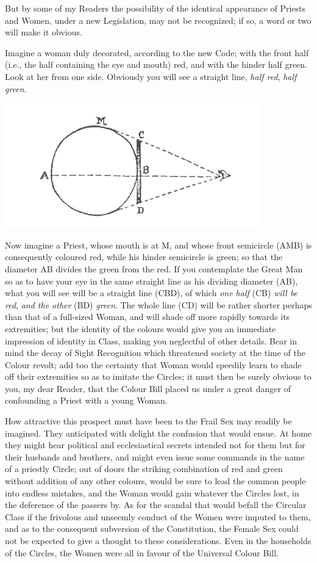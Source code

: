\documentclass[10pt, kindle, oneside]{kindle}
\begin{document}
But by some of my Readers the possibility of the identical appearance of
Priests and Women, under a new Legislation, may not be recognized; if so, a
word or two will make it obvious.

Imagine a woman duly decorated, according to the new Code; with the front half
(i.e., the half containing the eye and mouth) red, and with the hinder half
green. Look at her from one side. Obviously you will see a straight line, \emph{half
red}, \emph{half green}. 
\begin{center}
    \includegraphics[trim=0mm 0mm 0mm 0mm, scale=0.5]{fig5}
\end{center}

Now imagine a Priest, whose mouth is at M, and whose front semicircle (AMB) is
consequently coloured red, while his hinder semicircle is green; so that the
diameter AB divides the green from the red. If you contemplate the Great Man
so as to have your eye in the same straight line as his dividing diameter
(AB), what you will see will be a straight line (CBD), of which \emph{one half} (CB)
\emph{will be red}, \emph{and the other} (BD) \emph{green}. The whole line (CD) will be rather
shorter perhaps than that of a full-sized Woman, and will shade off more
rapidly towards its extremities; but the identity of the colours would give
you an immediate impression of identity in Class, making you neglectful of
other details. Bear in mind the decay of Sight Recognition which threatened
society at the time of the Colour revolt; add too the certainty that Woman
would speedily learn to shade off their extremities so as to imitate the
Circles; it must then be surely obvious to you, my dear Reader, that the
Colour Bill placed us under a great danger of confounding a Priest with a
young Woman.

How attractive this prospect must have been to the Frail Sex may readily be
imagined. They anticipated with delight the confusion that would ensue. At
home they might hear political and ecclesiastical secrets intended not for
them but for their husbands and brothers, and might even issue some commands
in the name of a priestly Circle; out of doors the striking combination of red
and green without addition of any other colours, would be sure to lead the
common people into endless mistakes, and the Woman would gain whatever the
Circles lost, in the deference of the passers by. As for the scandal that
would befall the Circular Class if the frivolous and unseemly conduct of the
Women were imputed to them, and as to the consequent subversion of the
Constitution, the Female Sex could not be expected to give a thought to these
considerations. Even in the households of the Circles, the Women were all in
favour of the Universal Colour Bill.
\end{document}
